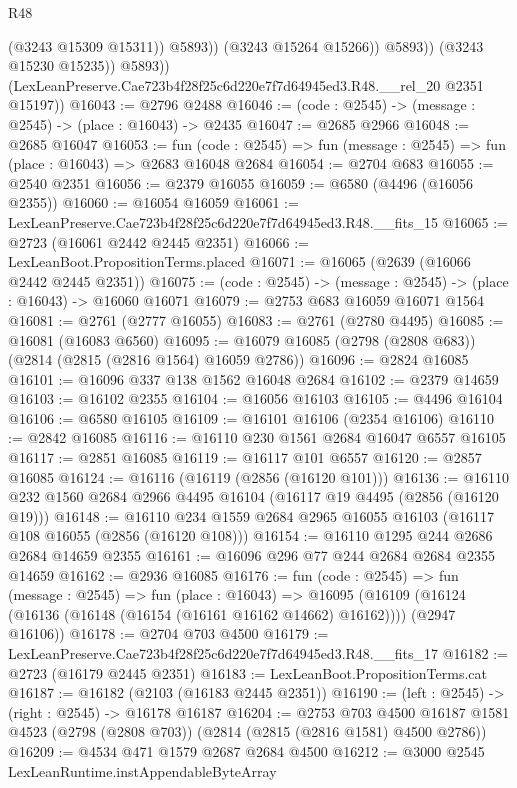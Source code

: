 \begin{lexlean}{R48}
\begin{coremodule}
                        (@3243 @15309 @15311))
                      @5893))
                  (@3243 @15264 @15266))
                @5893))
            (@3243 @15230 @15235))
          @5893))
      (LexLeanPreserve.Cae723b4f28f25c6d220e7f7d64945ed3.R48.__rel_20 @2351 @15197))
@16043 := @2796 @2488
@16046 := (code : @2545) -> (message : @2545) -> (place : @16043) -> @2435
@16047 := @2685 @2966
@16048 := @2685 @16047
@16053 := fun (code : @2545) => fun (message : @2545) => fun (place : @16043) => @2683 @16048 @2684
@16054 := @2704 @683
@16055 := @2540 @2351
@16056 := @2379 @16055
@16059 := @6580 (@4496 (@16056 @2355))
@16060 := @16054 @16059
@16061 := LexLeanPreserve.Cae723b4f28f25c6d220e7f7d64945ed3.R48.__fits_15
@16065 := @2723 (@16061 @2442 @2445 @2351)
@16066 := LexLeanBoot.PropositionTerms.placed
@16071 := @16065 (@2639 (@16066 @2442 @2445 @2351))
@16075 := (code : @2545) -> (message : @2545) -> (place : @16043) -> @16060 @16071
@16079 := @2753 @683 @16059 @16071 @1564
@16081 := @2761 (@2777 @16055)
@16083 := @2761 (@2780 @4495)
@16085 := @16081 (@16083 @6560)
@16095 := @16079 @16085 (@2798 (@2808 @683)) (@2814 (@2815 (@2816 @1564) @16059 @2786))
@16096 := @2824 @16085
@16101 := @16096 @337 @138 @1562 @16048 @2684
@16102 := @2379 @14659
@16103 := @16102 @2355
@16104 := @16056 @16103
@16105 := @4496 @16104
@16106 := @6580 @16105
@16109 := @16101 @16106 (@2354 @16106)
@16110 := @2842 @16085
@16116 := @16110 @230 @1561 @2684 @16047 @6557 @16105
@16117 := @2851 @16085
@16119 := @16117 @101 @6557
@16120 := @2857 @16085
@16124 := @16116 (@16119 (@2856 (@16120 @101)))
@16136 := @16110 @232 @1560 @2684 @2966 @4495 @16104 (@16117 @19 @4495 (@2856 (@16120 @19)))
@16148 := @16110 @234 @1559 @2684 @2965 @16055 @16103 (@16117 @108 @16055 (@2856 (@16120 @108)))
@16154 := @16110 @1295 @244 @2686 @2684 @14659 @2355
@16161 := @16096 @296 @77 @244 @2684 @2684 @2355 @14659
@16162 := @2936 @16085
@16176 := fun (code : @2545) =>
  fun (message : @2545) =>
  fun (place : @16043) =>
  @16095 (@16109 (@16124 (@16136 (@16148 (@16154 (@16161 @16162 @14662) @16162)))) (@2947 @16106))
@16178 := @2704 @703 @4500
@16179 := LexLeanPreserve.Cae723b4f28f25c6d220e7f7d64945ed3.R48.__fits_17
@16182 := @2723 (@16179 @2445 @2351)
@16183 := LexLeanBoot.PropositionTerms.cat
@16187 := @16182 (@2103 (@16183 @2445 @2351))
@16190 := (left : @2545) -> (right : @2545) -> @16178 @16187
@16204 := @2753
    @703
    @4500
    @16187
    @1581
    @4523
    (@2798 (@2808 @703))
    (@2814 (@2815 (@2816 @1581) @4500 @2786))
@16209 := @4534 @471 @1579 @2687 @2684 @4500
@16212 := @3000 @2545 LexLeanRuntime.instAppendableByteArray

\end{coremodule}
\end{lexlean}
